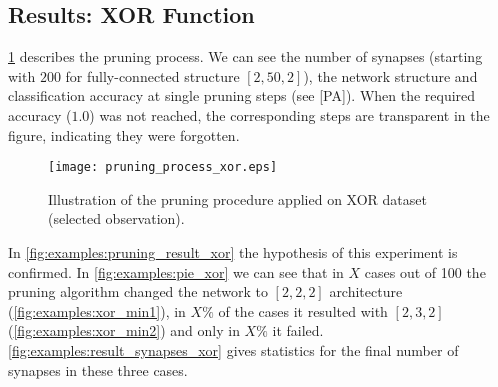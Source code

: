 \begin{table}[H]
\centering
{}
\caption{Experiment settings for XOR dataset.}
\label{tab:examples:xor_settings}
\end{table}

\subsection*{Results: XOR Function}
\cref{fig:examples:pruning_process_xor} describes the pruning process. We can see the number of synapses (starting with $ 200 $ for fully-connected structure $ [2, 50, 2] $), the network structure and classification accuracy at single pruning steps (see [PA]). When the required accuracy ($ 1.0 $) was not reached, the corresponding steps are transparent in the figure, indicating they were forgotten.

\begin{figure}[H]
\centering
\texttt{[image: pruning\_process\_xor.eps]}
\caption{Illustration of the pruning procedure applied on XOR dataset (selected observation).}
\label{fig:examples:pruning_process_xor}
\end{figure}

In \cref{fig:examples:pruning_result_xor} the hypothesis of this experiment is confirmed. In \cref{fig:examples:pie_xor} we can see that in $ X $ cases out of 100 the pruning algorithm changed the network to $ [2, 2, 2] $ architecture (\cref{fig:examples:xor_min1}), in $ X\% $ of the cases it resulted with $ [2, 3, 2] $ (\cref{fig:examples:xor_min2}) and only in $ X\% $ it failed. \cref{fig:examples:result_synapses_xor} gives statistics for the final number of synapses in these three cases.

